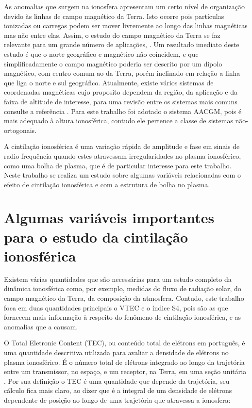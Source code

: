 As anomalias que surgem na ionosfera apresentam um certo nível de organização devido às linhas de campo magnético da Terra. Isto ocorre pois partículas ionizadas ou carregas podem ser mover livremente ao longo das linhas magnéticas mas não entre elas. Assim, o estudo do campo magnético da Terra se faz relevante para um grande número de aplicações, \cite{LAUNDAL:2017}. Um resultado imediato deste estudo é que o norte geográfico e magnético não coincidem, e que simplificadamente o campo magnético poderia ser descrito por um dipolo magnético, com centro comum ao da Terra, porém inclinado em relação a linha que liga o norte e sul geográfico. Atualmente, existe vários sistemas de coordenadas magnéticas cujo proposito dependem da região, da aplicação e da faixa de altitude de interesse, para uma revisão entre os sistemas mais comuns consulte a referência \cite{LAUNDAL:2017}. Para este trabalho foi adotado o sistema AACGM, pois é mais adequado à altura ionosférica, contudo ele pertence a classe de sistemas não-ortogonais.

A cintilação ionosférica é uma variação rápida de amplitude e fase em sinais de radio frequência quando estes atravessam irregularidades no plasma ionosférico, como uma bolha de plasma, que é de particular interesse para este trabalho. Neste trabalho se realiza um estudo sobre algumas variáveis relacionadas com o efeito de cintilação ionosférica e com a estrutura de bolha no plasma.

\section{Algumas variáveis importantes para o estudo da cintilação ionosférica}

Existem várias quantidades que são necessárias para um estudo completo da dinâmica ionosférica como, por exemplo, medidas do fluxo de radiação solar, do campo magnético da Terra, da composição da atmosfera. Contudo, este trabalho foca em duas quantidades principais o VTEC e o índice S4, pois são as que fornecem mais informação à respeito do fenômeno de cintilação ionosférica, e as anomalias que a causam.

O Total Eletronic Content (TEC), ou conteúdo total de elétrons em português, é uma quantidade descritiva utilizada para avaliar a densidade de elétrons no plasma ionosférico. É o número total de elétrons integrado ao longo da trajetória entre um transmissor, no espaço, e um receptor, na Terra, em uma seção unitária \cite{HOFMANN:2013}. Por sua definição o TEC é uma quantidade que depende da trajetória, seu cálculo fica mais claro, ao dizer que é a integral de um densidade de elétrons dependente de posição ao longo de uma trajetória que atravessa a ionosfera:

